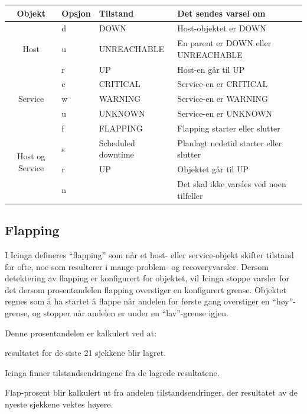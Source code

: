 \begin{table}
\begin{center}
\begin{tabular}{| c | l | l | p{7cm} |} \hline
        \textbf{Objekt} & \textbf{Opsjon} & \textbf{Tilstand} & \textbf{Det sendes varsel om} \\ \hline
	\multirow{3}{*}{Host} & d & DOWN 			& Host-objektet er DOWN 			\\ \cline{2-4}
					    & u & UNREACHABLE 		& En parent er DOWN eller UNREACHABLE		\\ \cline{2-4}	
					    & r & UP 			& Host-en går til UP				\\ \hline 
        \multirow{3}{*}{Service} 	    & c & CRITICAL 		& Service-en er CRITICAL 			\\ \cline{2-4}
					    & w & WARNING  		& Service-en er WARNING  			\\ \cline{2-4}
					    & u & UNKNOWN  		& Service-en er UNKNOWN  			\\ \hline
	\multirow{4}{*}{Host og Service} & f & FLAPPING           	& Flapping starter eller slutter 		\\ \cline{2-4}
					    & s & Scheduled downtime 	& Planlagt nedetid starter eller slutter 	\\ \cline{2-4}
				 	    & r & UP                 	& Objektet går til UP 				\\ \cline{2-4}  
					    & n &                    	& Det skal ikke varsles ved noen tilfeller 	\\ \cline{2-4}
	\hline
\end{tabular}
\label{objekt_varsling}
\end{center}
\end{table}

\subsection{Flapping}
I Icinga defineres ``flapping'' som når et host- eller service-objekt skifter tilstand for ofte, noe som resulterer i mange problem- og recoveryvarsler. Dersom detektering av flapping er konfigurert for objektet, vil Icinga stoppe varsler for det dersom prosentandelen flapping overstiger en konfigurert grense. Objektet regnes som å ha startet å flappe når andelen for første gang overstiger en ``høy''-grense, og stopper når andelen er under en ``lav''-grense igjen. \cite{icingaflapping}

Denne prosentandelen er kalkulert ved at:
\begin{enumerate*}
	\item resultatet for de siste 21 sjekkene blir lagret.
	\item Icinga finner tilstandsendringene fra de lagrede resultatene.
	\item Flap-prosent blir kalkulert ut fra andelen tilstandsendringer, der resultatet av de nyeste sjekkene vektes høyere.
\end{enumerate*}

